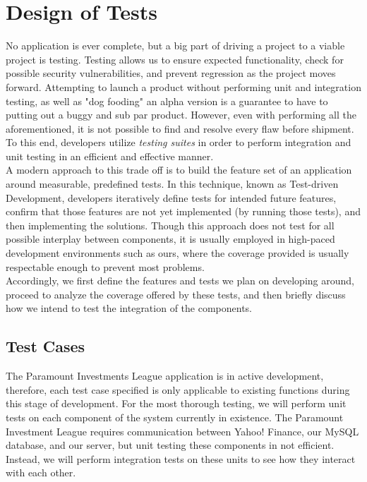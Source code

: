 \chapter{Design of Tests}

No application is ever complete, but a big part of driving a project to a viable
project is testing.  Testing allows us to ensure expected functionality, check
for possible security vulnerabilities, and prevent regression as the project
moves forward.  Attempting to launch a product without performing unit and
integration testing, as well as "dog fooding"\cite{wiki:dog} an alpha version is
a guarantee to have to putting out a buggy and sub par product. However, even
with performing all the aforementioned, it is not possible to find and resolve
every flaw before shipment. To this end, developers utilize
\emph{testing suites} in order to perform integration and unit testing in an
efficient and effective manner.\\

A modern approach to this trade off is to build the feature set of an
application around measurable, predefined tests. In this technique, known as
Test-driven Development\cite{wiki:tdd}, developers iteratively define tests for
intended future features, confirm that those features are not yet implemented
(by running those tests), and then implementing the solutions. Though this
approach does not test for all possible interplay between components, it is
usually employed in high-paced development environments such as ours, where the
coverage provided is usually respectable enough to prevent most problems.\\

Accordingly, we first define the features and tests we plan on developing
around, proceed to analyze the coverage offered by these tests, and then briefly
discuss how we intend to test the integration of the components.\\

\section{Test Cases}

The Paramount Investments League application is in active development,
therefore, each test case specified is only applicable to existing functions
during this stage of development. For the most thorough testing, we will perform
unit tests on each component of the system currently in existence. The Paramount
Investment League requires communication between Yahoo! Finance, our MySQL
database, and our server, but unit testing these components in not efficient.
Instead, we will perform integration tests on these units to see how they
interact with each other.\\

